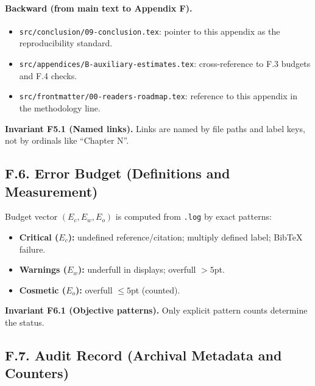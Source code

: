 \paragraph{Backward (from main text to Appendix F).}
\begin{itemize}
  \item \texttt{src/conclusion/09-conclusion.tex}: pointer to this appendix as the reproducibility standard.
  \item \texttt{src/appendices/B-auxiliary-estimates.tex}: cross-reference to F.3 budgets and F.4 checks.
  \item \texttt{src/frontmatter/00-readers-roadmap.tex}: reference to this appendix in the methodology line.
\end{itemize}

\noindent\textbf{Invariant F5.1 (Named links).} Links are named by file paths and label keys, not by ordinals like “Chapter N”.


\subsection*{F.6. Error Budget (Definitions and Measurement)}

\noindent
Budget vector $(E_c,E_w,E_o)$ is computed from \texttt{.log} by exact patterns:
\begin{itemize}
  \item \textbf{Critical ($E_c$):} undefined reference/citation; multiply defined label; BibTeX failure.
  \item \textbf{Warnings ($E_w$):} underfull in displays; overfull $>5$pt.
  \item \textbf{Cosmetic ($E_o$):} overfull $\le 5$pt (counted).
\end{itemize}
\noindent\textbf{Invariant F6.1 (Objective patterns).} Only explicit pattern counts determine the status.


\subsection*{F.7. Audit Record (Archival Metadata and Counters)}

